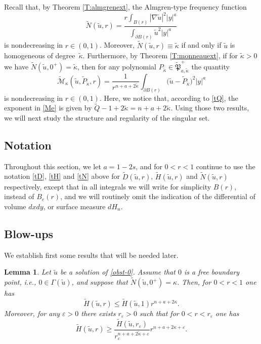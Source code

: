 \documentclass[11pt]{amsart}
\theoremstyle{plain}
\newtheorem{lemma}[thrm]{Lemma}
\numberwithin{equation}{section}
\begin{document}
Recall that, by Theorem \ref{T:almgrenext}, the Almgren-type frequency function
\[\tilde N(\tilde u,r)=\frac{r\int_{B(r)} |\nabla \tilde u|^2 |y|^a}{\int_{\partial B(r)} \tilde u^2 |y|^a}\]
is nondecreasing in $r\in(0,1)$.
Moreover, $\tilde N(\tilde u,r)\equiv \tilde \kappa$ if and only if $\tilde u$ is homogeneous of degree~$\tilde \kappa$.
Furthermore, by Theorem \ref{T:monneauext}, if  for $\tilde \kappa>0$ we have $\tilde N(\tilde u,0^+)=\tilde \kappa$, then for any polynomial $P_{\tilde \kappa}\in \tilde{\mathfrak P}_{a,\tilde \kappa}^+$ the quantity
\[
\tilde{\mathcal M}_{\kappa}(\tilde u, \tilde P_{\tilde \kappa},r)
=\frac{1}{r^{n+a+2\tilde \kappa}}\int_{\partial B(r)} \bigl(\tilde u-\tilde P_{\tilde \kappa}\bigr)^2 |y|^a
\]
is nondecreasing in $r\in(0,1)$. Here, we notice that, according to \eqref{tQ}, the exponent in \eqref{Me} is given by $\tilde Q - 1 + 2\tilde \kappa = n+a+2\tilde \kappa$.
Using those two results, we will next study the structure and regularity of the singular set.

\subsection{Notation}

Throughout this section, we let $a=1-2s$, and for $0<r<1$ continue to use the notation \eqref{tD}, \eqref{tH} and \eqref{tN} above for $\tilde D(\tilde u,r)$, $\tilde H(\tilde u,r)$ and $\tilde N(\tilde u,r)$ respectively, except that in all integrals we will write for simplicity $B(r)$, instead of $B_e(r)$, and we will routinely omit the indication of the differential of volume $dxdy$, or surface measure $dH_{n}$.

\subsection{Blow-ups}

We establish first some results that will be needed later.

\begin{lemma}\label{bound-H-0}
Let $\tilde u$ be a solution of \eqref{obst-0}.
Assume that $0$ is a free boundary point, i.e., $0\in \Gamma(\tilde u)$, and suppose that $\tilde N(\tilde u,0^+)=\kappa$.
Then, for $0<r<1$ one has
\begin{equation}\label{growth-H-kappa-0}
\tilde H(\tilde u,r) \leq \tilde H(\tilde u,1) r^{n+a+2\kappa}.
\end{equation}
Moreover, for any $\varepsilon>0$ there exists $r_{\varepsilon}>0$ such that for $0<r<r_{\varepsilon}$ one has
\begin{equation}\label{growth-H-kappa-below-0}
\tilde H(\tilde u,r) \ge \frac{\tilde H(\tilde u,r_{\varepsilon})}{r_{\varepsilon}^{n+a+2\tilde \kappa + {\varepsilon}}} r^{n+a+2\kappa+\varepsilon}.
\end{equation}
\end{lemma}
\end{document}

